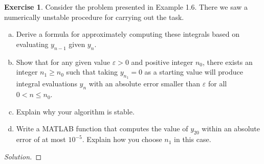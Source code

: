 \documentclass[12pt,a4]{article}
\theoremstyle{definition}
\newtheorem{exercise}{Exercise}
\begin{document}
\begin{exercise}
	Consider the problem presented in Example 1.6. There we saw a numerically unstable procedure for carrying out the task.
	
	\begin{enumerate}[(a)]
		\item Derive a formula for approximately computing these integrals based on evaluating $y_{n - 1}$ given $y_n$. 
		
		\item Show that for any given value $\varepsilon > 0$ and positive integer $n_0$, there exists an integer $n_1 \geq n_0$ such that taking $y_{n_1} = 0$ as a starting value will produce integral evaluations $y_n$ with an absolute error smaller than $\varepsilon$ for all $0 < n \leq n_0$. 
		
		\item Explain why your algorithm is stable.
		
		\item Write a MATLAB function that computes the value of $y_{20}$ within an absolute error of at most $10^{- 5}$. Explain how you choose $n_1$ in this case. 
	\end{enumerate}
\end{exercise}
\begin{proof}[Solution]
	
\end{proof}
\end{document}
